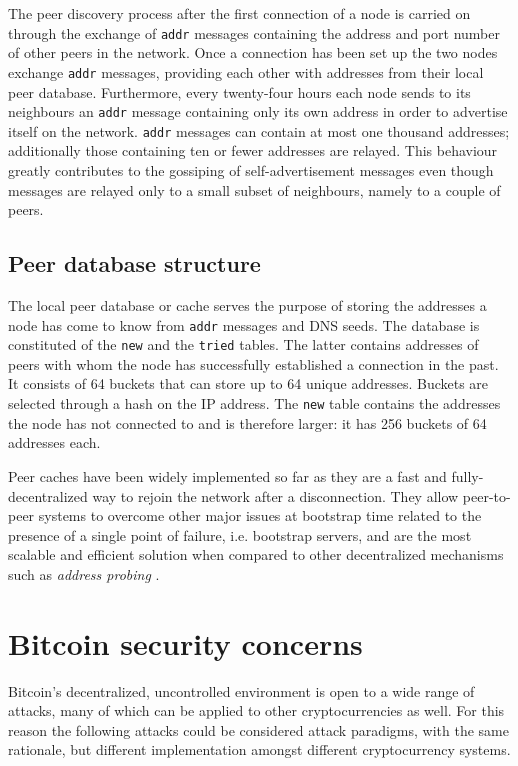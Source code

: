 \documentclass[12pt, letterpaper, twoside]{article}
\begin{document}
The peer discovery process after the first connection of a node is carried on through the exchange of \texttt{addr} messages containing the address and port number of other peers in the network. Once a connection has been set up the two nodes exchange \texttt{addr} messages, providing each other with addresses from their local peer database. Furthermore, every twenty-four hours each node sends to its neighbours an \texttt{addr} message containing only its own address in order to advertise itself on the network. \texttt{addr} messages can contain at most one thousand addresses; additionally those containing ten or fewer addresses are relayed. This behaviour greatly contributes to the gossiping of self-advertisement messages even though messages are relayed only to a small subset of neighbours, namely to a couple of peers.

\subsection{Peer database structure}\label{cachestruct}
The local peer database or cache serves the purpose of storing the addresses a node has come to know from \texttt{addr} messages and DNS seeds. The database is constituted of the \texttt{new} and the \texttt{tried} tables. The latter contains addresses of peers with whom the node has successfully established a connection in the past. It consists of 64 buckets that can store up to 64 unique addresses. Buckets are selected through a hash on the IP address. The \texttt{new} table contains the addresses the node has not connected to and is therefore larger: it has 256 buckets of 64 addresses each.

Peer caches have been widely implemented so far as they are a fast and fully-decentralized way to rejoin the network after a disconnection. They allow peer-to-peer systems to overcome other major issues at bootstrap time related to the presence of a single point of failure, i.e. bootstrap servers, and are the most scalable and efficient solution when compared to other decentralized mechanisms such as \textit{address probing} \cite{decentrbootstrapp2p}.

\section{Bitcoin security concerns}\label{securityintro}
Bitcoin's decentralized, uncontrolled environment is open to a wide range of attacks, many of which can be applied to other cryptocurrencies as well. For this reason the following attacks could be considered attack paradigms, with the same rationale, but different implementation amongst different cryptocurrency systems.
\end{document}
